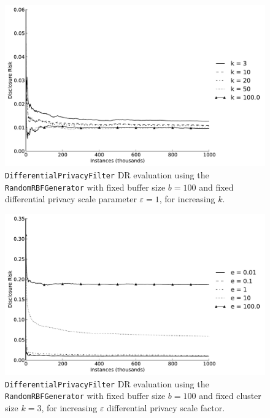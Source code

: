 \begin{figure}[h]
	\centering
	\includegraphics[width=0.9\linewidth]{figures/dr_dp-e1-random.pdf}
	\caption[Differential privacy DR evaluation ($b = 100,~\varepsilon = 1$).]{\texttt{DifferentialPrivacyFilter} DR evaluation using the \texttt{RandomRBFGenerator} with fixed buffer size $b = 100$ and fixed differential privacy scale parameter $\varepsilon = 1$, for increasing $k$.}
	\label{fig:results-dr-dp-e1}
\end{figure}

\begin{figure}[h]
	\centering
	\includegraphics[width=0.9\linewidth]{figures/dr_dp-k3-random.pdf}
	\caption[Differential privacy DR evaluation ($b = 100,~k = 3$).]{\texttt{DifferentialPrivacyFilter} DR evaluation using the \texttt{RandomRBFGenerator} with fixed buffer size $b = 100$ and fixed cluster size $k = 3$, for increasing $\varepsilon$ differential privacy scale factor.}
	\label{fig:results-dr-dp-k3}
\end{figure}


